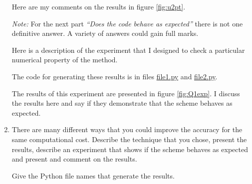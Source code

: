 \documentclass[12pt]{article}
\begin{document}
\begin{enumerate}
Here are my comments on the results in figure \ref{fig:u2pt}.

{\it Note:} For the next part {\it``Does the code behave as expected''} there is not one definitive answer. A variety of answers could gain full marks.

Here is a description of the experiment that I designed to check a particular numerical property of the method.

The code for generating these results is in files \url{file1.py} and \url{file2.py}.

The results of this experiment are presented in figure \ref{fig:Q1exp}. I discuss the results here and say if they demonstrate that the scheme behaves as expected. 

\item There are many different ways that you could improve the accuracy for the same computational cost. Describe the technique that you chose, present the results, describe an experiment that shows if the scheme behaves as expected and present and comment on the results.

Give the Python file names that generate the results.

\end{enumerate}
\end{document}
